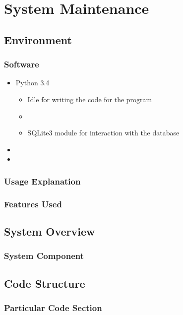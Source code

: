 \chapter{System Maintenance}


\section{Environment}

\subsection{Software}
\begin{itemize}
\item Python 3.4
\begin{itemize}
\item Idle for writing the code for the program
\item 
\item SQLite3 module for interaction with the database


\end{itemize}
\item 
\item 

\end{itemize}
\subsection{Usage Explanation}

\subsection{Features Used}

\section{System Overview}

\subsection{System Component}

\section{Code Structure}

\subsection{Particular Code Section}
\begin{comment}
\begin{figure}[H]
    \pythonfile[firstline=5,lastline=10]{./tex/function_programs/print_function.py}
    \caption{The print() function} \label{fig:print_function}
\end{figure}
\end{comment}

